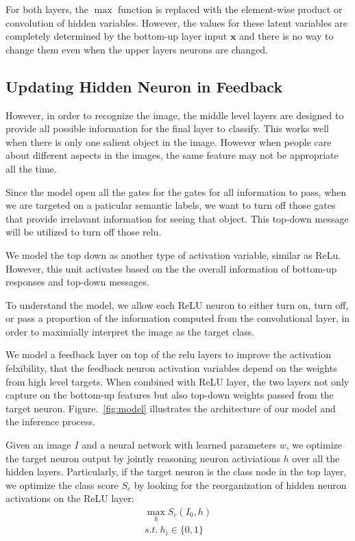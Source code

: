 For both layers, the $\max$ function is replaced with the element-wise product or convolution of hidden variables. However, the values for these latent variables are completely determined by the bottom-up layer input $\mathbf{x}$ and there is no way to change them even when the upper layers neurons are changed.
 
\subsection{Updating Hidden Neuron in Feedback}
However, in order to recognize the image, the middle level layers are designed to provide all possible information for the final layer to classify. This works well when there is only one salient object in the image. However when people care about different aspects in the images, the same feature may not be appropriate all the time. 

Since the model open all the gates for the gates for all information to pass, when we are targeted on a paticular semantic labels, we want to turn off those gates that provide irrelavant information for seeing that object. This top-down message will be utilized to turn off those relu.

We model the top down as another type of activation variable, similar as ReLu. However, this unit activates based on the the overall information of bottom-up responses and top-down messages. 

To understand the model, we allow each ReLU neuron to either turn on, turn off, or pass a proportion of the information computed from the convolutional layer, in order to maximially interpret the image as the target class.

We model a feedback layer on top of the relu layers to improve the activation felxibility, that the feedback neuron activation variables depend on the weights from high level targets. When combined with ReLU layer, the two layers not only capture on the bottom-up features but also top-down weights passed from the target neuron. Figure.~\ref{fig:model} illustrates the architecture of our model and the inference process. 
 
Given an image $I$ and a neural network with learned parameters $w$, we optimize the target neuron output by jointly reasoning neuron activiations $h$ over all the hidden layers. Particularly, if the target neuron is the class node in the top layer, we optimize the class score $S_c$ by looking for the reorganization of hidden neuron activations on the ReLU layer:
\begin{equation}
\begin{aligned}
  \max_h S_c(I_0, h) \\
  s.t.\ h_i \in \{0, 1\}
\end{aligned}
\end{equation}

